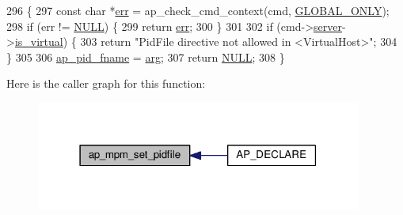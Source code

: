 \begin{DoxyCode}
296 \{
297     \textcolor{keyword}{const} \textcolor{keywordtype}{char} *\hyperlink{group__AP__EXPR_gaccebe6c638c552d2845014cf8bdea8d8}{err} = ap\_check\_cmd\_context(cmd, \hyperlink{group__ap__check__cmd__context_ga8f2f401b1d57a151c5ba871088ba097e}{GLOBAL\_ONLY});
298     \textcolor{keywordflow}{if} (err != \hyperlink{pcre_8txt_ad7f989d16aa8ca809a36bc392c07fba1}{NULL}) \{
299         \textcolor{keywordflow}{return} \hyperlink{group__AP__EXPR_gaccebe6c638c552d2845014cf8bdea8d8}{err};
300     \}
301 
302     \textcolor{keywordflow}{if} (cmd->\hyperlink{structcmd__parms__struct_ac89b2e2ae2254315b7a2a0df4c633e28}{server}->\hyperlink{structserver__rec_ace39fc136327b4ab9c381ec708d93ad0}{is\_virtual}) \{
303         \textcolor{keywordflow}{return} \textcolor{stringliteral}{"PidFile directive not allowed in <VirtualHost>"};
304     \}
305 
306     \hyperlink{group__APACHE__MPM_ga4bb083f6085cef22dd8d12343eea4328}{ap\_pid\_fname} = \hyperlink{group__APACHE__CORE__LISTEN_ga71f9d4c76ff7cd8f3db5697a5cfa7b08}{arg};
307     \textcolor{keywordflow}{return} \hyperlink{pcre_8txt_ad7f989d16aa8ca809a36bc392c07fba1}{NULL};
308 \}
\end{DoxyCode}


Here is the caller graph for this function\+:
\nopagebreak
\begin{figure}[H]
\begin{center}
\leavevmode
\includegraphics[width=303pt]{group__APACHE__MPM_ga1ce942de41c51ee14978cf8bb1dc9018_icgraph}
\end{center}
\end{figure}


